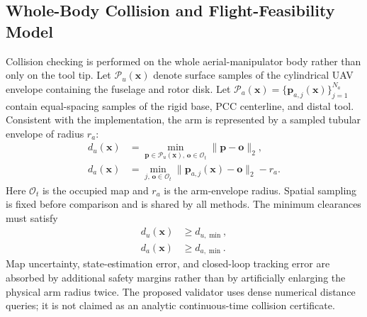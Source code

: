 \documentclass[journal,twoside]{IEEEtran}
\begin{document}
\subsection{Whole-Body Collision and Flight-Feasibility Model}
Collision checking is performed on the whole aerial-manipulator body rather than only on the tool tip. Let $\mathcal P_u(\mathbf x)$ denote surface samples of the cylindrical UAV envelope containing the fuselage and rotor disk. Let $\mathcal P_a(\mathbf x)=\{\mathbf p_{a,j}(\mathbf x)\}_{j=1}^{N_a}$ contain equal-spacing samples of the rigid base, PCC centerline, and distal tool. Consistent with the implementation, the arm is represented by a sampled tubular envelope of radius $r_a$:
\begin{equation}
\begin{aligned}
 d_u(\mathbf x)&=\min_{\mathbf p\in\mathcal P_u(\mathbf x),\,\mathbf o\in\mathcal O_t}
 \|\mathbf p-\mathbf o\|_2,\\
 d_a(\mathbf x)&=\min_{j,\,\mathbf o\in\mathcal O_t}
 \|\mathbf p_{a,j}(\mathbf x)-\mathbf o\|_2-r_a.
\end{aligned}
\label{eq:arm_envelope}
\end{equation}
Here $\mathcal O_t$ is the occupied map and $r_a$ is the arm-envelope radius. Spatial sampling is fixed before comparison and is shared by all methods. The minimum clearances must satisfy
\begin{equation}
\begin{aligned}
 d_u(\mathbf x)&\ge d_{u,\min},\\
 d_a(\mathbf x)&\ge d_{a,\min}.
\end{aligned}
\label{eq:clearance_constraints}
\end{equation}
Map uncertainty, state-estimation error, and closed-loop tracking error are absorbed by additional safety margins rather than by artificially enlarging the physical arm radius twice. The proposed validator uses dense numerical distance queries; it is not claimed as an analytic continuous-time collision certificate.
\end{document}
